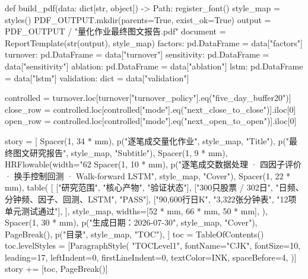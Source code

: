 \documentclass[UTF8,a4paper,fontset=fandol]{ctexart}
\begin{document}
\begin{ProjectCode}
{def build_pdf(data: dict[str, object]) -> Path:
    register_font()
    style_map = styles()
    PDF_OUTPUT.mkdir(parents=True, exist_ok=True)
    output = PDF_OUTPUT / "量化作业最终图文报告.pdf"
    document = ReportTemplate(str(output), style_map)
    factors: pd.DataFrame = data["factors"]
    turnover: pd.DataFrame = data["turnover"]
    sensitivity: pd.DataFrame = data["sensitivity"]
    ablation: pd.DataFrame = data["ablation"]
    lstm: pd.DataFrame = data["lstm"]
    validation: dict = data["validation"]

    controlled = turnover.loc[turnover["turnover_policy"].eq("five_day_buffer20")]
    close_row = controlled.loc[controlled["mode"].eq("next_close_to_close")].iloc[0]
    open_row = controlled.loc[controlled["mode"].eq("next_open_to_open")].iloc[0]

    story = [
        Spacer(1, 34 * mm),
        p("逐笔成交量化作业", style_map, "Title"),
        p("最终图文研究报告", style_map, "Subtitle"),
        Spacer(1, 9 * mm),
        HRFlowable(width="62%
        Spacer(1, 10 * mm),
        p("逐笔成交数据处理 · 四因子评价 · 换手控制回测 · Walk-forward LSTM", style_map, "Cover"),
        Spacer(1, 22 * mm),
        table(
            [
                ["研究范围", "核心产物", "验证状态"],
                ["300只股票 / 302日", "日频、分钟频、因子、回测、LSTM", "PASS"],
                ["90,600行日K", "3,322张分钟表", "12项单元测试通过"],
            ],
            style_map,
            widths=[52 * mm, 66 * mm, 50 * mm],
        ),
        Spacer(1, 30 * mm),
        p("生成日期：2026-07-30", style_map, "Cover"),
        PageBreak(),
        p("目录", style_map, "TOC"),
    ]
    toc = TableOfContents()
    toc.levelStyles = [ParagraphStyle(
        "TOCLevel1",
        fontName="CJK",
        fontSize=10,
        leading=17,
        leftIndent=0,
        firstLineIndent=0,
        textColor=INK,
        spaceBefore=4,
    )]
    story += [toc, PageBreak()]

}
\end{ProjectCode}
\end{document}
